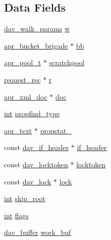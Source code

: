 \subsection*{Data Fields}
\begin{DoxyCompactItemize}
\item 
\hyperlink{structdav__walk__params}{dav\+\_\+walk\+\_\+params} \hyperlink{structdav__walker__ctx_a0139e9bc9666780fd522efd2b48fd599}{w}
\item 
\hyperlink{structapr__bucket__brigade}{apr\+\_\+bucket\+\_\+brigade} $\ast$ \hyperlink{structdav__walker__ctx_aab3897a11cbab7491982f41884f04887}{bb}
\item 
\hyperlink{structapr__pool__t}{apr\+\_\+pool\+\_\+t} $\ast$ \hyperlink{structdav__walker__ctx_a86c199dadc816b5fd8b6a70f1e1edbcc}{scratchpool}
\item 
\hyperlink{structrequest__rec}{request\+\_\+rec} $\ast$ \hyperlink{structdav__walker__ctx_af55712be4c33037660ba0eb114448f40}{r}
\item 
\hyperlink{structapr__xml__doc}{apr\+\_\+xml\+\_\+doc} $\ast$ \hyperlink{structdav__walker__ctx_abf48f7fa0d795815ffa9e6e21dd5833a}{doc}
\item 
\hyperlink{pcre_8txt_a42dfa4ff673c82d8efe7144098fbc198}{int} \hyperlink{structdav__walker__ctx_a4eb8fb86c1c79d652074f92d36d180c1}{propfind\+\_\+type}
\item 
\hyperlink{structapr__text}{apr\+\_\+text} $\ast$ \hyperlink{structdav__walker__ctx_abc9381a961e46ec1db9bf6c2efb76c7e}{propstat\+\_}
\item 
const \hyperlink{structdav__if__header}{dav\+\_\+if\+\_\+header} $\ast$ \hyperlink{structdav__walker__ctx_aa49644d94a98a75b3474a63b7dc2440f}{if\+\_\+header}
\item 
const \hyperlink{structdav__locktoken}{dav\+\_\+locktoken} $\ast$ \hyperlink{structdav__walker__ctx_a1f3340d6f2109b48955872ad9437309c}{locktoken}
\item 
const \hyperlink{structdav__lock}{dav\+\_\+lock} $\ast$ \hyperlink{structdav__walker__ctx_ad2fa702097c703af687d3ac30d0e4e90}{lock}
\item 
\hyperlink{pcre_8txt_a42dfa4ff673c82d8efe7144098fbc198}{int} \hyperlink{structdav__walker__ctx_aea5a12dc0690c2a329ceeace753fcef9}{skip\+\_\+root}
\item 
\hyperlink{pcre_8txt_a42dfa4ff673c82d8efe7144098fbc198}{int} \hyperlink{structdav__walker__ctx_a0af5f3818e73f77edc1ea122102ab652}{flags}
\item 
\hyperlink{structdav__buffer}{dav\+\_\+buffer} \hyperlink{structdav__walker__ctx_a335d8f8a2fc9d74e627b07f87f2ffe76}{work\+\_\+buf}
\end{DoxyCompactItemize}


